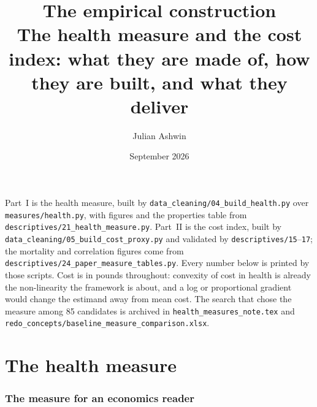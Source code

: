\documentclass[11pt]{article}
\title{The empirical construction\\[2pt]
\large The health measure and the cost index: what they are made of, how they are built, and what they deliver}
\author{Julian Ashwin}
\date{September 2026}
\newcommand{\code}[1]{\texttt{\small #1}}
\begin{document}
\maketitle

\noindent Part~I is the health measure, built by \code{data\_cleaning/04\_build\_health.py} over
\code{measures/health.py}, with figures and the properties table from
\code{descriptives/21\_health\_measure.py}. Part~II is the cost index, built by
\code{data\_cleaning/05\_build\_cost\_proxy.py} and validated by
\code{descriptives/15}--\code{17}; the mortality and correlation figures come from \code{descriptives/24\_paper\_measure\_tables.py}. Every number below is printed by those scripts. Cost is in pounds throughout: convexity of cost in health is already the non-linearity the framework is about, and a log or proportional gradient would change the estimand away from mean cost. The search that
chose the measure among 85 candidates is archived in \code{health\_measures\_note.tex} and
\code{redo\_concepts/baseline\_measure\_comparison.xlsx}.

\tableofcontents

\part{The health measure}

\section{The measure for an economics reader}
\label{sec:econ}
\end{document}
